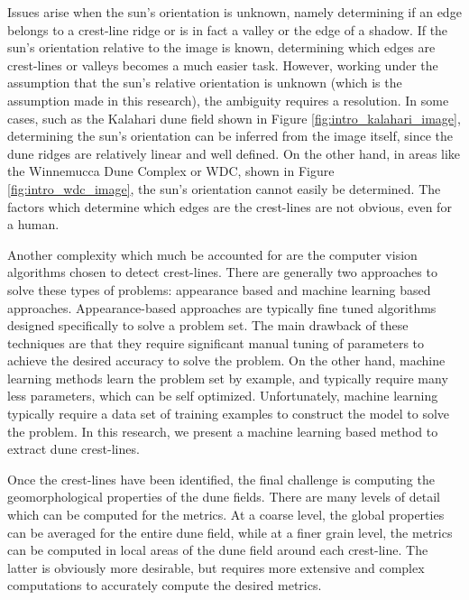 Issues arise when the sun's orientation is unknown, namely determining if an edge belongs to a crest-line ridge or is in fact a valley or the edge of a shadow. If the sun's orientation relative to the image is known, determining which edges are crest-lines or valleys becomes a much easier task. However, working under the assumption that the sun's relative orientation is unknown (which is the assumption made in this research), the ambiguity requires a resolution. In some cases, such as the Kalahari dune field shown in Figure \ref{fig:intro_kalahari_image}, determining the sun's orientation can be inferred from the image itself, since the dune ridges are relatively linear and well defined. On the other hand, in areas like the Winnemucca Dune Complex or WDC, shown in Figure \ref{fig:intro_wdc_image}, the sun's orientation cannot easily be determined. The factors which determine which edges are the crest-lines are not obvious, even for a human.

Another complexity which much be accounted for are the computer vision algorithms chosen to detect crest-lines. There are generally two approaches to solve these types of problems: appearance based and machine learning based approaches. Appearance-based approaches are typically fine tuned algorithms designed specifically to solve a problem set. The main drawback of these techniques are that they require significant manual tuning of parameters to achieve the desired accuracy to solve the problem. On the other hand, machine learning methods learn the problem set by example, and typically require many less parameters, which can be self optimized. Unfortunately, machine learning typically require a data set of training examples to construct the model to solve the problem. In this research, we present a machine learning based method to extract dune crest-lines. %

Once the crest-lines have been identified, the final challenge is computing the geomorphological properties of the dune fields. There are many levels of detail which can be computed for the metrics. At a coarse level, the global properties can be averaged for the entire dune field, while at a finer grain level, the metrics can be computed in local areas of the dune field around each crest-line. The latter is obviously more desirable, but requires more extensive and complex computations to accurately compute the desired metrics.

